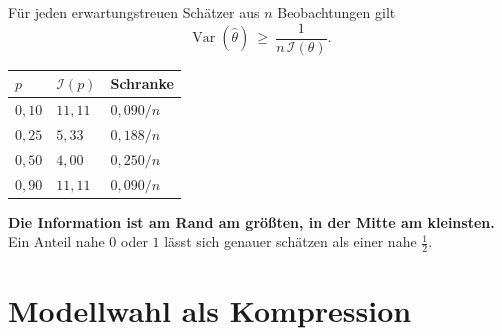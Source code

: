 \begin{merksatz}
Für jeden erwartungstreuen Schätzer aus $n$ Beobachtungen gilt
\[ \operatorname{Var}(\hat\theta) \ \ge\ \frac{1}{n\,\mathcal{I}(\theta)} . \]

\begin{center}
{\small
\renewcommand{\arraystretch}{1.48}
\begin{tabular}{@{}P{1.6cm}P{2.0cm}P{2.6cm}@{}}
\toprule
$p$ & $\mathcal{I}(p)$ & \textbf{Schranke}\\
\midrule
$0{,}10$ & $11{,}11$ & $0{,}090/n$\\
$0{,}25$ & $5{,}33$ & $0{,}188/n$\\
$0{,}50$ & $4{,}00$ & $0{,}250/n$\\
$0{,}90$ & $11{,}11$ & $0{,}090/n$\\
\bottomrule
\end{tabular}}
\end{center}

\begin{center}
\begin{minipage}{0.9\textwidth}
\textbf{Die Information ist am Rand am größten, in der Mitte am kleinsten.} Ein Anteil nahe $0$ oder $1$ lässt sich genauer schätzen als einer nahe $\frac12$.
\end{minipage}
\end{center}

\begin{center}
\begin{minipage}{0.88\textwidth}
\end{minipage}
\end{center}
\end{merksatz}

\section{Modellwahl als Kompression}

